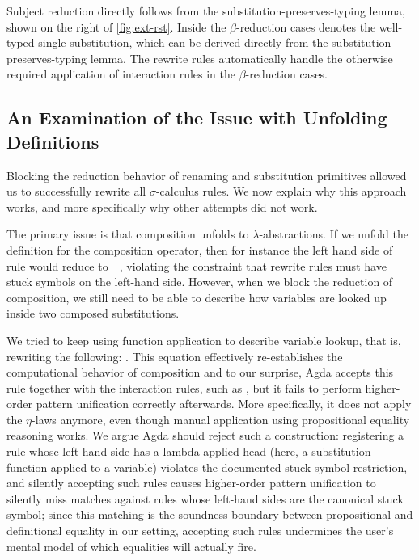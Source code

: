 \documentclass[a4paper,UKenglish,cleveref, autoref, thm-restate,anonymous]{lipics-v2021}
\begin{document}
Subject reduction  directly follows from the
substitution-preserves-typing lemma, shown on the right of
\cref{fig:ext-rst}. Inside the $β$-reduction cases  denotes
the well-typed single substitution, which can be derived directly from the
substitution-preserves-typing lemma. The rewrite rules automatically handle
the otherwise required application of interaction rules in the
$β$-reduction cases.

\subsection{An Examination of the Issue with Unfolding Definitions}\label{sec:mis-ex}
Blocking the reduction behavior of renaming and substitution primitives allowed
us to successfully rewrite all $σ$-calculus rules. We now explain why this
approach works, and more specifically why other attempts did not work.

The primary issue is that composition unfolds to $λ$-abstractions. If we
unfold the definition for the composition operator, then for instance the left
hand side of  rule would reduce to~\EIdLawUnfolded{}~,
violating the constraint that rewrite rules must have stuck symbols on the
left-hand side. However, when we block the reduction of composition, we still
need to be able to describe how variables are looked up inside two composed
substitutions.

We tried to keep using function application to describe variable lookup, that
is, rewriting the following: \EFunAppInterp{}. This equation effectively
re-establishes the computational behavior of composition and to our surprise,
Agda accepts this rule together with the interaction rules, such as
, but it fails to perform higher-order pattern
unification correctly afterwards. More specifically, it does not apply the
$η$-laws anymore, even though manual application using propositional equality
reasoning works. We argue Agda should reject such a construction: registering
a rule whose left-hand side has a lambda-applied head (here, a substitution
function applied to a variable) violates the documented stuck-symbol
restriction, and silently accepting such rules causes higher-order pattern
unification to silently miss matches against rules whose left-hand sides are
the canonical stuck symbol; since this matching is the soundness boundary
between propositional and definitional equality in our setting, accepting
such rules undermines the user's mental model of which equalities will
actually fire.
\end{document}
